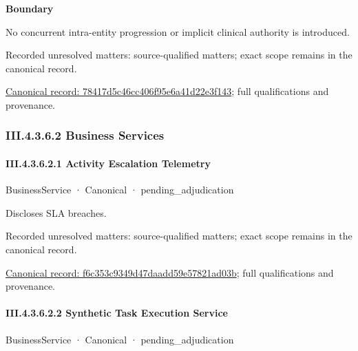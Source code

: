 \textbf{Boundary}



No concurrent intra-entity progression or implicit clinical authority is introduced.


{\small Recorded unresolved matters: source-qualified matters; exact scope remains in the canonical record.}\par
{\footnotesize \href{../../../../../../../../continuum/business/business-function/78417d5c46cc406f95e6a41d22e3f143.md}{Canonical record: 78417d5c46cc406f95e6a41d22e3f143}; full qualifications and provenance.}\par
\subsubsection*{III.4.3.6.2 Business Services}
\label{navigation:III.4.3.6.2}

\paragraph*{III.4.3.6.2.1 Activity Escalation Telemetry}
\label{navigation:III.4.3.6.2.1}

\label{element:f6c353c9349d47daadd59e57821ad03b}
{\small BusinessService · Canonical · pending\_adjudication}\par

Discloses SLA breaches.


{\small Recorded unresolved matters: source-qualified matters; exact scope remains in the canonical record.}\par
{\footnotesize \href{../../../../../../../../continuum/business/business-service/f6c353c9349d47daadd59e57821ad03b.md}{Canonical record: f6c353c9349d47daadd59e57821ad03b}; full qualifications and provenance.}\par
\paragraph*{III.4.3.6.2.2 Synthetic Task Execution Service}
\label{navigation:III.4.3.6.2.2}

\label{element:57317da133ba4e29bde3997921f92e2e}
{\small BusinessService · Canonical · pending\_adjudication}\par

